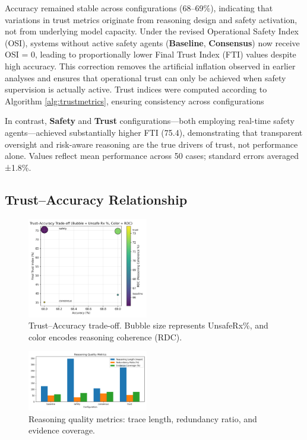 \documentclass[letterpaper]{article} %
\begin{document}
Accuracy remained stable across configurations (68–69\%), indicating that variations in trust metrics originate from reasoning design and safety activation, not from underlying model capacity.  
Under the revised Operational Safety Index (OSI), systems without active safety agents (\textbf{Baseline}, \textbf{Consensus}) now receive OSI = 0, leading to proportionally lower Final Trust Index (FTI) values despite high accuracy.  
This correction removes the artificial inflation observed in earlier analyses and ensures that operational trust can only be achieved when safety supervision is actually active.
Trust indices were computed according to Algorithm \ref{alg:trustmetrics}, ensuring consistency across configurations

In contrast, \textbf{Safety} and \textbf{Trust} configurations—both employing real-time safety agents—achieved substantially higher FTI (75.4), demonstrating that transparent oversight and risk-aware reasoning are the true drivers of trust, not performance alone. Values reflect mean performance across 50 cases; standard errors averaged ±1.8\%.


\subsection{Trust–Accuracy Relationship}

\begin{figure}[t]
\centering
\includegraphics[width=0.47\textwidth]{fig2_trust_accuracy_tradeoff.png}
\caption{Trust--Accuracy trade-off. Bubble size represents UnsafeRx\%, and color encodes reasoning coherence (RDC).}
\label{fig:bubble_tradeoff}
\end{figure}

\begin{figure}[t]
\centering
\includegraphics[width=0.47\textwidth]{fig3_reasoning_quality.png}
\caption{Reasoning quality metrics: trace length, redundancy ratio, and evidence coverage.}
\label{fig:reasoning_quality}
\end{figure}
\end{document}
